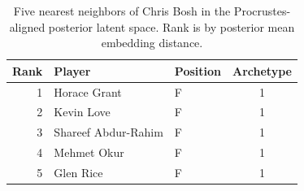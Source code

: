 \begin{table}[htbp]
  \centering\small
  \begin{tabular}{rllc}
    \toprule
    Rank & Player & Position & Archetype \\
    \midrule
    1 & Horace Grant & F & 1 \\
    2 & Kevin Love & F & 1 \\
    3 & Shareef Abdur-Rahim & F & 1 \\
    4 & Mehmet Okur & F & 1 \\
    5 & Glen Rice & F & 1 \\
    \bottomrule
  \end{tabular}
  \caption{Five nearest neighbors of Chris Bosh in the Procrustes-aligned posterior latent space. Rank is by posterior mean embedding distance.}
  \label{tab:Chris_Bosh_neighbors}
\end{table}


